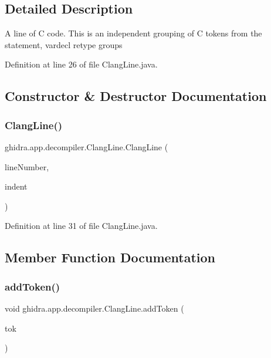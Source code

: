\subsection{Detailed Description}
A line of C code. This is an independent grouping of C tokens from the statement, vardecl retype groups 

Definition at line 26 of file Clang\+Line.\+java.



\subsection{Constructor \& Destructor Documentation}
\mbox{\label{classghidra_1_1app_1_1decompiler_1_1_clang_line_ac72a0805f4ffb6f6545886aa9a326fa8}} 
\subsubsection{\texorpdfstring{ClangLine()}{ClangLine()}}
{\footnotesize\ttfamily ghidra.\+app.\+decompiler.\+Clang\+Line.\+Clang\+Line (\begin{DoxyParamCaption}\item[{int}]{line\+Number,  }\item[{int}]{indent }\end{DoxyParamCaption})\hspace{0.3cm}{\ttfamily [inline]}}



Definition at line 31 of file Clang\+Line.\+java.



\subsection{Member Function Documentation}
\mbox{\label{classghidra_1_1app_1_1decompiler_1_1_clang_line_a98375c4be1990b582f3ec1bd9bd6e5d5}} 
\subsubsection{\texorpdfstring{addToken()}{addToken()}}
{\footnotesize\ttfamily void ghidra.\+app.\+decompiler.\+Clang\+Line.\+add\+Token (\begin{DoxyParamCaption}\item[{\mbox{\hyperlink{classghidra_1_1app_1_1decompiler_1_1_clang_token}{Clang\+Token}}}]{tok }\end{DoxyParamCaption})\hspace{0.3cm}{\ttfamily [inline]}}



